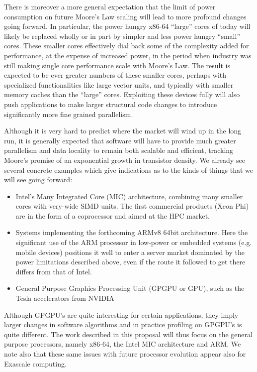 \documentclass[notitlepage,letter,12pt]{article}
\begin{document}
There is moreover a more general expectation that the limit of power
consumption on future Moore's Law scaling will lead to more profound
changes going forward. In particular, the power hungry x86-64 ``large''
cores of today will likely be replaced wholly or in part by simpler
and less power hungry ``small'' cores. These smaller cores effectively
dial back some of the complexity added for performance, at the
expense of increased power, in the period when industry was still
making single core performance scale with Moore's Law.  The result
is expected to be ever greater numbers of these smaller cores,
perhaps with specialized functionalities like large vector units,
and typically with smaller memory caches than the ``large'' cores.
Exploiting these devices fully will also push applications to make
larger structural code changes to introduce significantly more fine
grained parallelism.

Although it is very hard to predict where the market will wind up
in the long run, it is generally expected that software will have
to provide much greater parallelism and data locality to remain
both scalable and efficient, tracking Moore's promise of an exponential
growth in transistor density. We already see several concrete
examples which give indications as to the kinds of things that we
will see going forward:

\begin{itemize}
\item Intel's Many Integrated Core (MIC) architecture, combining many smaller cores with very-wide SIMD units. The first commercial products (Xeon Phi) are in the form of a coprocessor and aimed at the HPC market.
\item Systems implementing the forthcoming ARMv8 64bit architecture.  Here the significant use of the ARM processor in low-power or embedded systems (e.g. mobile devices) positions it well to enter a server market dominated by the power limitations described above, even if the route it followed to get there differs from
that of Intel.
\item General Purpose Graphics Processing Unit (GPGPU or GPU), such as the Tesla accelerators from NVIDIA
\end{itemize}

Although GPGPU's are quite interesting for certain applications, they
imply larger changes in software algorithms and in practice profiling
on GPGPU's is quite different. The work described in this proposal will 
thus focus on the general purpose processors, namely x86-64, the Intel MIC 
architecture and ARM. We note also that these same issues with future
processor evolution appear also for Exascale computing. 
\end{document}
